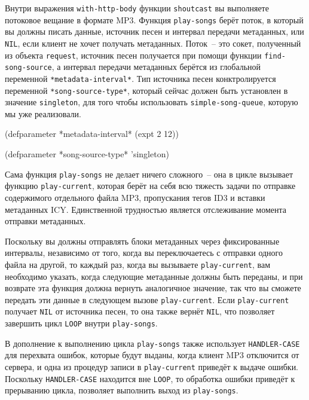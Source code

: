 Внутри выражения \lstinline{with-http-body} функции \lstinline{shoutcast} вы выполняете потоковое
вещание в формате MP3.  Функция \lstinline{play-songs} берёт поток, в который вы должны писать
данные, источник песен и интервал передачи метаданных, или \lstinline{NIL}, если клиент не
хочет получать метаданных.  Поток~-- это сокет, полученный из объекта \lstinline{request},
источник песен получается при помощи функции \lstinline{find-song-source}, а интервал передачи
метаданных берётся из глобальной переменной \lstinline{*metadata-interval*}.  Тип источника
песен конктролируется переменной \lstinline{*song-source-type*}, который сейчас должен быть
установлен в значение \lstinline{singleton}, для того чтобы использовать
\lstinline{simple-song-queue}, которую мы уже реализовали.

\begin{myverb}
(defparameter *metadata-interval* (expt 2 12))

(defparameter *song-source-type* 'singleton)
\end{myverb}

Сама функция \lstinline{play-songs} не делает ничего сложного~-- она в цикле вызывает функцию
\lstinline{play-current}, которая берёт на себя всю тяжесть задачи по отправке содержимого
отдельного файла MP3, пропускания тегов ID3 и вставки метаданных ICY.  Единственной
трудностью является отслеживание момента отправки метаданных.

Поскольку вы должны отправлять блоки метаданных через фиксированные интервалы, независимо
от того, когда вы переключаетесь с отправки одного файла на другой, то каждый раз, когда вы
вызываете \lstinline{play-current}, вам необходимо указать, когда следующие метаданные должны
быть переданы, и при возврате эта функция должна вернуть аналогичное значение, так что вы
сможете передать эти данные в следующем вызове \lstinline{play-current}.  Если
\lstinline{play-current} получает \lstinline{NIL} от источника песен, то она также вернёт
\lstinline{NIL}, что позволяет завершить цикл \lstinline{LOOP} внутри \lstinline{play-songs}.

В дополнение к выполнению цикла \lstinline{play-songs} также использует \lstinline{HANDLER-CASE}
для перехвата ошибок, которые будут выданы, когда клиент MP3 отключится от сервера, и одна
из процедур записи в \lstinline{play-current} приведёт к выдаче ошибки. Поскольку
\lstinline{HANDLER-CASE} находится вне \lstinline{LOOP}, то обработка ошибки приведёт к прерыванию
цикла, позволяет выполнить выход из \lstinline{play-songs}.

